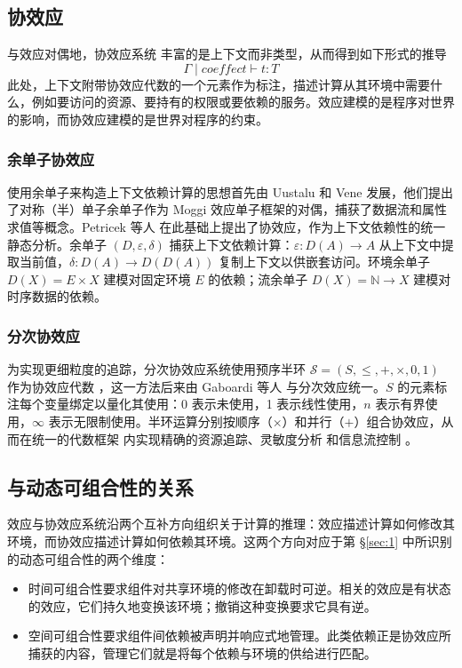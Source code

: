 \subsection{协效应}
\label{sec:2.2}

与效应对偶地，协效应系统 \cite{ref18, ref31} 丰富的是上下文而非类型，从而得到如下形式的推导
\begin{equation}
\label{eq:2.3}
\Gamma \mid \textit{coeffect} \vdash t : T
\end{equation}
此处，上下文附带协效应代数的一个元素作为标注，描述计算从其环境中需要什么，例如要访问的资源、要持有的权限或要依赖的服务。效应建模的是程序对世界的影响，而协效应建模的是世界对程序的约束。

\subsubsection{余单子协效应}
\label{sec:2.2.1}

使用余单子来构造上下文依赖计算的思想首先由 Uustalu 和 Vene \cite{ref32} 发展，他们提出了对称（半）单子余单子作为 Moggi 效应单子框架的对偶，捕获了数据流和属性求值等概念。Petricek 等人 \cite{ref18} 在此基础上提出了协效应，作为上下文依赖性的统一静态分析。余单子 $(D, \varepsilon, \delta)$ 捕获上下文依赖计算：$\varepsilon : D(A) \to A$ 从上下文中提取当前值，$\delta : D(A) \to D(D(A))$ 复制上下文以供嵌套访问。环境余单子 $D(X) = E \times X$ 建模对固定环境 $E$ 的依赖；流余单子 $D(X) = \mathbb{N} \to X$ 建模对时序数据的依赖。

\subsubsection{分次协效应}
\label{sec:2.2.2}

为实现更细粒度的追踪，分次协效应系统使用预序半环 $\mathcal{S} = (S, \leqslant, +, \times, 0, 1)$ 作为协效应代数 \cite{ref33}，这一方法后来由 Gaboardi 等人 \cite{ref19} 与分次效应统一。$S$ 的元素标注每个变量绑定以量化其使用：0 表示未使用，1 表示线性使用，$n$ 表示有界使用，$\infty$ 表示无限制使用。半环运算分别按顺序（$\times$）和并行（$+$）组合协效应，从而在统一的代数框架 \cite{ref37} 内实现精确的资源追踪、灵敏度分析 \cite{ref34} 和信息流控制 \cite{ref35, ref36}。

\subsection{与动态可组合性的关系}
\label{sec:2.3}

效应与协效应系统沿两个互补方向组织关于计算的推理：效应描述计算如何修改其环境，而协效应描述计算如何依赖其环境。这两个方向对应于第 \S\ref{sec:1} 中所识别的动态可组合性的两个维度：
\begin{itemize}
\item 时间可组合性要求组件对共享环境的修改在卸载时可逆。相关的效应是有状态的效应，它们持久地变换该环境；撤销这种变换要求它具有逆。
\item 空间可组合性要求组件间依赖被声明并响应式地管理。此类依赖正是协效应所捕获的内容，管理它们就是将每个依赖与环境的供给进行匹配。
\end{itemize}


